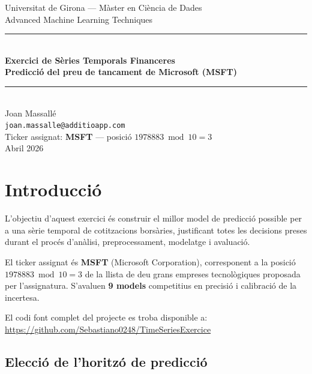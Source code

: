 \documentclass[12pt,a4paper]{article}
\begin{document}
\begin{titlepage}
  \centering
  \vspace*{2cm}
  {\small Universitat de Girona — Màster en Ciència de Dades\\
         Advanced Machine Learning Techniques}\\[1.5cm]
  \rule{\linewidth}{0.4pt}\\[0.6cm]
  {\LARGE\bfseries Exercici de Sèries Temporals Financeres\\[0.4cm]
   \large Predicció del preu de tancament de Microsoft (MSFT)}\\[0.4cm]
  \rule{\linewidth}{0.4pt}\\[2cm]
  {\large Joan Massallé}\\[0.4cm]
  {\normalsize \texttt{joan.massalle@additioapp.com}}\\[0.4cm]
  {\normalsize Ticker assignat: \textbf{MSFT} — posició $1978883 \bmod 10 = 3$}\\[3cm]
  {\normalsize Abril 2026}
  \vfill
\end{titlepage}

\tableofcontents
\newpage

\section{Introducció}

L'objectiu d'aquest exercici és construir el millor model de predicció possible per a una
sèrie temporal de cotitzacions borsàries, justificant totes les decisions preses durant el
procés d'anàlisi, preprocessament, modelatge i avaluació.

El ticker assignat és \textbf{MSFT} (Microsoft Corporation), corresponent a la posició
$1978883 \bmod 10 = 3$ de la llista de deu grans empreses tecnològiques proposada per
l'assignatura. S'avaluen \textbf{9 models} competitius en precisió i calibració
de la incertesa.

El codi font complet del projecte es troba disponible a:
\url{https://github.com/Sebastiano0248/TimeSeriesExercice}

\subsection*{Elecció de l'horitzó de predicció}
\end{document}
